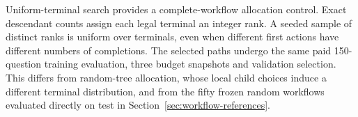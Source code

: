 Uniform-terminal search provides a complete-workflow allocation control.
Exact descendant counts assign each legal terminal an integer rank. A
seeded sample of distinct ranks is uniform over terminals, even when
different first actions have different numbers of completions. The selected
paths undergo the same paid 150-question training evaluation, three budget
snapshots and validation selection. This differs from random-tree allocation,
whose local child choices induce a different terminal distribution, and
from the fifty frozen random workflows evaluated directly on test in
Section~\ref{sec:workflow-references}.
